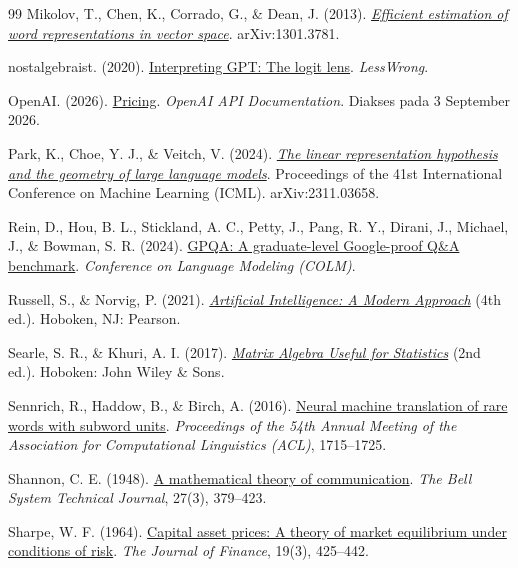 \begin{thebibliography}{99}
Mikolov, T., Chen, K., Corrado, G., \& Dean, J. (2013).
\href{https://arxiv.org/abs/1301.3781}{\emph{Efficient estimation of word
representations in vector space}}. arXiv:1301.3781.

nostalgebraist. (2020).
\href{https://www.lesswrong.com/posts/AcKRB8wDpdaN6v6ru/interpreting-gpt-the-logit-lens}{Interpreting
GPT: The logit lens}. \emph{LessWrong}.

OpenAI. (2026).
\href{https://developers.openai.com/api/docs/pricing}{Pricing}.
\emph{OpenAI API Documentation}. Diakses pada 3 September 2026.

Park, K., Choe, Y. J., \& Veitch, V. (2024).
\href{https://arxiv.org/abs/2311.03658}{\emph{The linear representation hypothesis
and the geometry of large language models}}. Proceedings of the 41st International
Conference on Machine Learning (ICML). arXiv:2311.03658.

Rein, D., Hou, B. L., Stickland, A. C., Petty, J., Pang, R. Y., Dirani, J.,
Michael, J., \& Bowman, S. R. (2024).
\href{https://arxiv.org/abs/2311.12022}{GPQA: A graduate-level Google-proof
Q\&A benchmark}. \emph{Conference on Language Modeling (COLM)}.

Russell, S., \& Norvig, P. (2021).
\href{https://archive.org/details/artificialintell0000russ_v4h1}{\emph{Artificial
Intelligence: A Modern Approach}} (4th ed.). Hoboken, NJ: Pearson.

Searle, S. R., \& Khuri, A. I. (2017).
\href{https://archive.org/details/matrixalgebrause0000sear}{\emph{Matrix
Algebra Useful for Statistics}} (2nd ed.). Hoboken: John Wiley \& Sons.

Sennrich, R., Haddow, B., \& Birch, A. (2016).
\href{https://arxiv.org/abs/1508.07909}{Neural machine translation of rare
words with subword units}. \emph{Proceedings of the 54th Annual Meeting of
the Association for Computational Linguistics (ACL)}, 1715--1725.

Shannon, C. E. (1948).
\href{https://ieeexplore.ieee.org/document/6773024}{A mathematical theory of
communication}. \emph{The Bell System Technical Journal}, 27(3), 379--423.

Sharpe, W. F. (1964).
\href{https://doi.org/10.1111/j.1540-6261.1964.tb02865.x}{Capital asset prices:
A theory of market equilibrium under conditions of risk}. \emph{The Journal of
Finance}, 19(3), 425--442.


\end{thebibliography}

